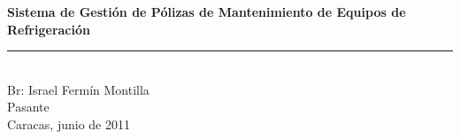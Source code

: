 \documentclass[a4paper, 12pt]{article}
\begin{document}
\begin{figure}[htbp]
\end{figure}

\begin{center}

\vspace*{145pt}
\bigskip

\textbf{Sistema de Gestión de Pólizas de Mantenimiento de Equipos de Refrigeración}


\vspace*{200pt}

\rule{10cm}{1pt} \\
Br: Israel Fermín Montilla \\
Pasante\\

\vspace*{55pt}
Caracas, junio de 2011

\end{center}
\end{document}
